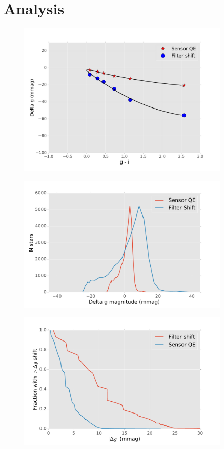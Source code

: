 \documentclass[12pt]{article}
\begin{document}
\section{Analysis}
\begin{figure}
\includegraphics[width=0.9\textwidth]{figures/delta_g_vs_color.pdf}
\caption{\label{fig:delta_g_vs_color}}
\end{figure}

\begin{figure}
\includegraphics[width=0.9\textwidth]{figures/delta_g_histogram.pdf}
\caption{\label{fig:delta_g_histogram}}
\end{figure}

\begin{figure}
\includegraphics[width=0.9\textwidth]{figures/delta_g_cumulative.pdf}
\caption{\label{fig:delta_g_cumulative}}
\end{figure}
\end{document}
